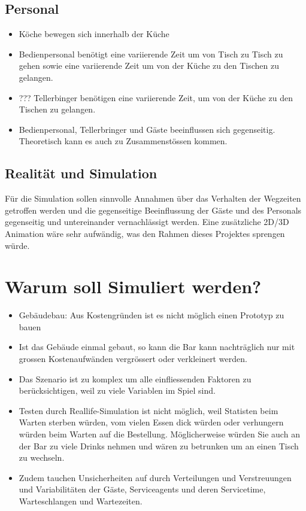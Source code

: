 \documentclass[ngerman,a4paper,12pt]{scrreprt}
\begin{document}
	\subsection{Personal}
		\begin{itemize}
			\item Köche bewegen sich innerhalb der Küche
			\item Bedienpersonal benötigt eine variierende Zeit um von Tisch zu Tisch zu gehen sowie eine variierende Zeit um von der Küche zu den Tischen zu gelangen.
			\item ??? Tellerbinger benötigen eine variierende Zeit, um von der Küche zu den Tischen zu gelangen.
			\item Bedienpersonal, Tellerbringer und Gäste beeinflussen sich gegenseitig. Theoretisch kann es auch zu Zusammenstössen kommen.
		\end{itemize}

	\subsection{Realität und Simulation}
		Für die Simulation sollen sinnvolle Annahmen über das Verhalten der Wegzeiten getroffen werden und die gegenseitige Beeinflussung der Gäste und des Personals gegenseitig und untereinander vernachlässigt werden. Eine zusätzliche 2D/3D Animation wäre sehr aufwändig, was den Rahmen dieses Projektes sprengen würde.



\section{Warum soll Simuliert werden?}
	\begin{itemize}
		\item Gebäudebau: Aus Kostengründen ist es nicht möglich einen Prototyp zu bauen
		\item Ist das Gebäude einmal gebaut, so kann die Bar kann nachträglich nur mit grossen Kostenaufwänden vergrössert oder verkleinert werden.
		\item Das Szenario ist zu komplex um alle einfliessenden Faktoren zu berücksichtigen, weil zu viele Variablen im Spiel sind.
		\item Testen durch Reallife-Simulation ist nicht möglich, weil Statisten beim Warten sterben würden, vom vielen Essen dick würden oder verhungern würden beim Warten auf die Bestellung. Möglicherweise würden Sie auch an der Bar zu viele Drinks nehmen und wären zu betrunken um an einen Tisch zu wechseln.
		\item Zudem tauchen Unsicherheiten auf durch Verteilungen und Verstreuungen und Variabilitäten der Gäste, Serviceagents und deren Servicetime, Warteschlangen und Wartezeiten.
	\end{itemize}
\end{document}
